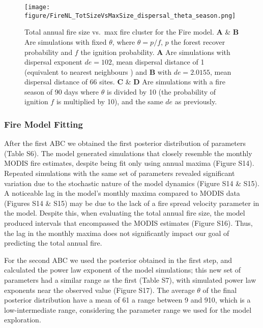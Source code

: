 \documentclass[
]{article}
\begin{document}
\begin{figure}
\centering
\texttt{[image: figure/FireNL\_TotSizeVsMaxSize\_dispersal\_theta\_season.png]}
\caption{Total annual fire size vs.~max fire cluster for the Fire model.
\textbf{A} \& \textbf{B} Are simulations with fixed \(\theta\), where
\(\theta = p/f\), \(p\) the forest recover probability and \(f\) the
ignition probability. \textbf{A} Are simulations with dispersal exponent
\(de=102\), mean dispersal distance of 1 (equivalent to nearest
neighbours ) and \textbf{B} with \(de=2.0155\), mean dispersal distance
of 66 sites. \textbf{C} \& \textbf{D} Are simulations with a fire season
of 90 days where \(\theta\) is divided by 10 (the probability of
ignition \(f\) is multiplied by 10), and the same \(de\) as previously.}
\end{figure}

\subsubsection{Fire Model Fitting}\label{fire-model-fitting-1}

After the first ABC we obtained the first posterior distribution of
parameters (Table S6). The model generated simulations that closely
resemble the monthly MODIS fire estimates, despite being fit only using
annual maxima (Figure S14). Repeated simulations with the same set of
parameters revealed significant variation due to the stochastic nature
of the model dynamics (Figure S14 \& S15). A noticeable lag in the
model's monthly maxima compared to MODIS data (Figures S14 \& S15) may
be due to the lack of a fire spread velocity parameter in the model.
Despite this, when evaluating the total annual fire size, the model
produced intervals that encompassed the MODIS estimates (Figure S16).
Thus, the lag in the monthly maxima does not significantly impact our
goal of predicting the total annual fire.

For the second ABC we used the posterior obtained in the first step, and
calculated the power law exponent of the model simulations; this new set
of parameters had a similar range as the first (Table S7), with
simulated power law exponents near the observed value (Figure S17). The
average \(\theta\) of the final posterior distribution have a mean of 61
a range between 9 and 910, which is a low-intermediate range,
considering the parameter range we used for the model exploration.
\end{document}
